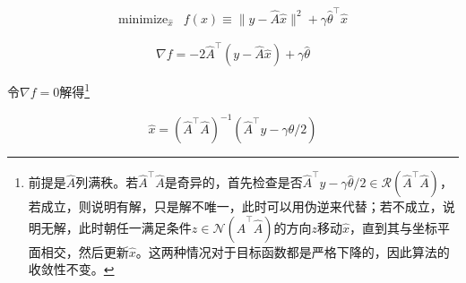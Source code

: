 \begin{equation}\label{opt4}
\begin{array}{rc}
\text{minimize}_{\hat{x}} &
f(x)\equiv \|y-\hat{A}\hat{x}\|^2+\gamma\hat{\theta}^{\top}\hat{x}
\end{array}
\end{equation}

\[\nabla f=-2\hat{A}^{\top}(y-\hat{A}\hat{x})+\gamma\hat{\theta}\]

令$\nabla f=0$解得\footnote{前提是$\hat{A}$列满秩。若$\hat{A}^{\top}\hat{A}$是奇异的，首先检查是否$\hat{A}^{\top}y-\gamma\hat{\theta}/2\in \mathcal{R}(\hat{A}^{\top}\hat{A})$，若成立，则说明有解，只是解不唯一，此时可以用伪逆来代替；若不成立，说明无解，此时朝任一满足条件$z\in\mathcal{N}(\hat{A}^{\top}\hat{A})$的方向$z$移动$\hat{x}$，直到其与坐标平面相交，然后更新$\hat{x}$。这两种情况对于目标函数都是严格下降的，因此算法的收敛性不变。}


\[\hat{x}=(\hat{A}^{\top}\hat{A})^{-1}
(\hat{A}^{\top}y-\gamma\hat{\theta}/2)\]



